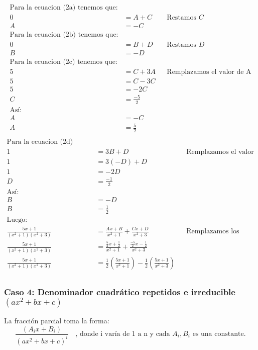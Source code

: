 \documentclass{templateNote}
\begin{document}
\begin{align*}
    \text{Para la ecuacion (2a) tenemos que:} \\
    0 &= A + C && \text{Restamos $C$} \\
    A &= -C \\
    \text{Para la ecuacion (2b) tenemos que:} \\
    0 &= B + D && \text{Restamos $D$} \\
    B &= -D \\
    \text{Para la ecuacion (2c) tenemos que:} \\
    5 &= C + 3A && \text{Remplazamos el valor de A} \\
    5 &= C - 3C \\
    5 &= -2C \\
    C &= \frac{-5}{2} \\
    \text{Así:} \\
    A &= -C \\
    A &= \frac{5}{2} \\
\end{align*}
\begin{align*}
    \text{Para la ecuacion (2d) tenemos que:} \\
    1 &= 3B + D && \text{Remplazamos el valor de B} \\
    1 &= 3(-D) + D \\
    1 &= -2D \\
    D &= \frac{-1}{2} \\
    \text{Así:} \\
    B &= -D \\
    B &= \frac{1}{2} \\
    \text{Luego:} \\
    \frac{5x+1}{(x^2+1)(x^2+3)} &= \frac{Ax+B}{x^2+1} + \frac{Cx + D}{x^2+3} && \text{Remplazamos los valores}\\
    \frac{5x+1}{(x^2+1)(x^2+3)} &= \frac{\frac{5}{2}x+\frac{1}{2}}{x^2+1} + \frac{\frac{-5}{2}x - \frac{1}{2}}{x^2+3}\\
    \frac{5x+1}{(x^2+1)(x^2+3)} &= \frac{1}{2}\left(\frac{5x+1}{x^2+1}\right) - \frac{1}{2}\left(\frac{5x + 1}{x^2+3}\right)\\
\end{align*}

\newpage
\subsubsection{Caso 4: Denominador cuadrático repetidos e irreducible $(ax^2 + bx + c)$}
\indent
La fracción parcial toma la forma:
\[
    \frac{(A_ix + B_i)}{(ax^2 + bx + c)^i} \quad \text{, donde i varía de 1 a n y cada } A_i, B_i \text{ es una constante.}
\]
\end{document}
